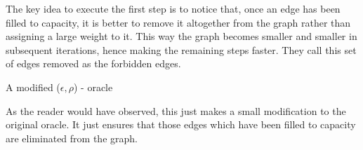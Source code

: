 \documentclass[BTech]{iitmdiss}
\begin{document}
	      The key idea to execute the first step is to notice that, once an edge has been filled to capacity, it is better to remove it altogether
	      from the graph rather than assigning a large weight to it. This way the graph becomes smaller and smaller in subsequent iterations,
	      hence making the remaining steps faster. They call this set of edges removed as the forbidden edges. \\
	      
	      \begin{algorithm}[H]
	     \caption{A modified ($\epsilon, \rho$) - oracle}
	    \end{algorithm}
	     As the reader would have observed, this just makes a small modification to the original oracle. It just ensures that those edges which have been
	     filled to capacity are eliminated from the graph. \\
	    	     
\end{document}
